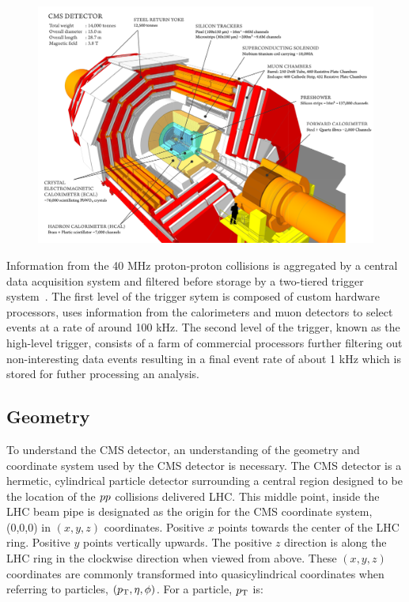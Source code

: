 \begin{figure}[htbp]
\centering
     \includegraphics[width=1.0\textwidth]{cms_and_lhc/plots/cms_detector.png}
     \caption{
     }
     \label{fig:cms_detector}
\end{figure}

Information from the 40 MHz proton-proton collisions is aggregated by a central data acquisition system
and filtered before storage by a two-tiered trigger system~\cite{Khachatryan:2016bia}. 
The first level of the trigger sytem is composed of custom hardware processors, uses information 
from the calorimeters and muon detectors to select events at a rate of around 100 kHz. The second level of
the trigger, known as the high-level trigger, consists of a farm of commercial processors further
filtering out non-interesting data events resulting in a final event rate of about 1 kHz which is stored
for futher processing an analysis.



\subsection{Geometry}
To understand the CMS detector, an understanding of the geometry and coordinate system used by the 
CMS detector is necessary. The CMS detector is a hermetic, cylindrical particle detector surrounding
a central region designed to be the location of the $pp$ collisions delivered LHC. This middle
point, inside the LHC beam pipe is designated as the origin for the CMS coordinate system, (0,0,0) in
$(x, y, z)$ coordinates. Positive $x$ points towards the center of the LHC ring.
Positive $y$ points vertically upwards. The positive $z$ direction is along the LHC ring in the
clockwise direction when viewed from above. These $(x, y, z)$ coordinates are commonly transformed
into quasicylindrical coordinates when referring to particles, $(p_\mathrm{T}, \eta, \phi)$. For a particle,
$p_\mathrm{T}$ is:

